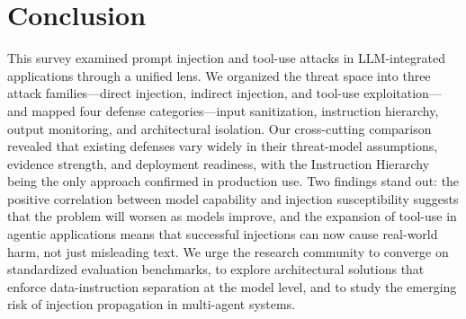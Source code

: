 \section{Conclusion}
\label{sec:conclusion}

This survey examined prompt injection and tool-use attacks in LLM-integrated applications through a unified lens. We organized the threat space into three attack families---direct injection, indirect injection, and tool-use exploitation---and mapped four defense categories---input sanitization, instruction hierarchy, output monitoring, and architectural isolation. Our cross-cutting comparison revealed that existing defenses vary widely in their threat-model assumptions, evidence strength, and deployment readiness, with the Instruction Hierarchy being the only approach confirmed in production use. Two findings stand out: the positive correlation between model capability and injection susceptibility suggests that the problem will worsen as models improve, and the expansion of tool-use in agentic applications means that successful injections can now cause real-world harm, not just misleading text. We urge the research community to converge on standardized evaluation benchmarks, to explore architectural solutions that enforce data-instruction separation at the model level, and to study the emerging risk of injection propagation in multi-agent systems.
